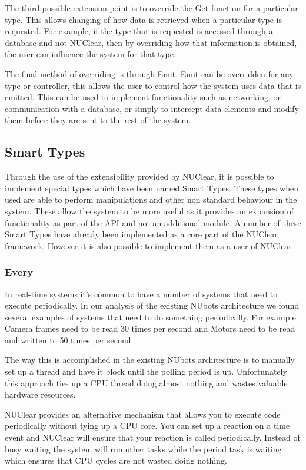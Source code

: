 \documentclass[english,12pt]{scrartcl}
\begin{document}
			The third possible extension point is to override the Get function for a particular type.
			This allows changing of how data is retrieved when a particular type is requested.
			For example, if the type that is requested is accessed through a database and not NUClear, then by overriding how that information is obtained, the user can influence the system for that type.

			The final method of overriding is through Emit.
			Emit can be overridden for any type or controller, this allows the user to control how the system uses data that is emitted.
			This can be used to implement functionality such as networking, or communication with a database, or simply to intercept data elements and modify them before they are sent to the rest of the system.

		\subsection{Smart Types}
			Through the use of the extensibility provided by NUClear, it is possible to implement special types which have been named Smart Types.
			These types when used are able to perform manipulations and other non standard behaviour in the system.
			These allow the system to be more useful as it provides an expansion of functionality as part of the API and not an additional module.
			A number of these Smart Types have already been implemented as a core part of the NUClear framework, However it is also possible to implement them as a user of NUClear

			\subsubsection{Every}
				In real-time systems it's common to have a number of systems that need to execute periodically.
				In our analysis of the existing NUbots architecture we found several examples of systems that need to do something periodically.
				For example Camera frames need to be read 30 times per second and Motors need to be read and written to 50 times per second.

				The way this is accomplished in the existing NUbots architecture is to manually set up a thread and have it block until the polling period is up.
				Unfortunately this approach ties up a CPU thread doing almost nothing and wastes valuable hardware resources.

				NUClear provides an alternative mechanism that allows you to execute code periodically without tying up a CPU core.
				You can set up a reaction on a time event and NUClear will ensure that your reaction is called periodically.
				Instead of busy waiting the system will run other tasks while the period task is waiting which ensures that CPU cycles are not wasted doing nothing.
\end{document}
